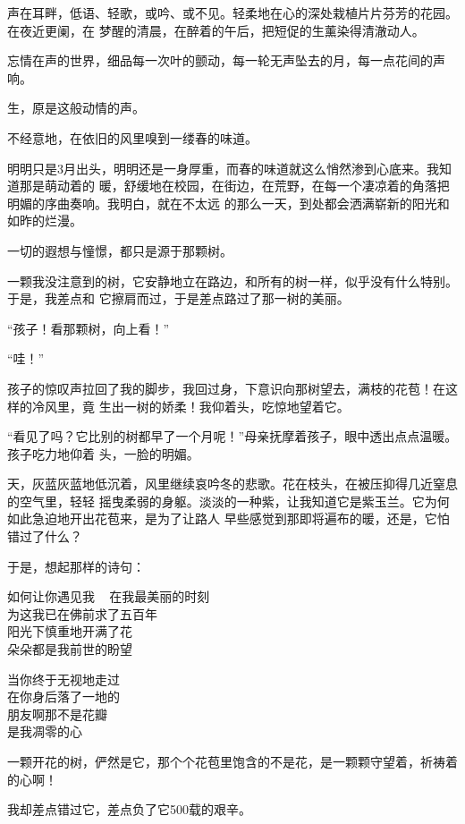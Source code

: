 		声在耳畔，低语、轻歌，或吟、或不见。轻柔地在心的深处栽植片片芬芳的花园。在夜近更阑，在
	梦醒的清晨，在醉着的午后，把短促的生薰染得清澈动人。

		忘情在声的世界，细品每一次叶的颤动，每一轮无声坠去的月，每一点花间的声响。

		生，原是这般动情的声。

	\endwriting



		不经意地，在依旧的风里嗅到一缕春的味道。

		明明只是3月出头，明明还是一身厚重，而春的味道就这么悄然渗到心底来。我知道那是萌动着的
	暖，舒缓地在校园，在街边，在荒野，在每一个凄凉着的角落把明媚的序曲奏响。我明白，就在不太远
	的那么一天，到处都会洒满崭新的阳光和如昨的烂漫。

		一切的遐想与憧憬，都只是源于那颗树。

		一颗我没注意到的树，它安静地立在路边，和所有的树一样，似乎没有什么特别。于是，我差点和
	它擦肩而过，于是差点路过了那一树的美丽。

		“孩子！看那颗树，向上看！”

		“哇！”

		孩子的惊叹声拉回了我的脚步，我回过身，下意识向那树望去，满枝的花苞！在这样的冷风里，竟
	生出一树的娇柔！我仰着头，吃惊地望着它。

		“看见了吗？它比别的树都早了一个月呢！”母亲抚摩着孩子，眼中透出点点温暖。孩子吃力地仰着
	头，一脸的明媚。

		天，灰蓝灰蓝地低沉着，风里继续哀吟冬的悲歌。花在枝头，在被压抑得几近窒息的空气里，轻轻
	摇曳柔弱的身躯。淡淡的一种紫，让我知道它是紫玉兰。它为何如此急迫地开出花苞来，是为了让路人
	早些感觉到那即将遍布的暖，还是，它怕错过了什么？

		于是，想起那样的诗句：

		\longpoem{}{}{}
			如何让你遇见我 ~ 在我最美丽的时刻 \\
			为这我已在佛前求了五百年 \\
			阳光下慎重地开满了花 \\
			朵朵都是我前世的盼望

			当你终于无视地走过 \\
			在你身后落了一地的 \\
			朋友啊那不是花瓣 \\
			是我凋零的心
		\endlongpoem

		一颗开花的树，俨然是它，那个个花苞里饱含的不是花，是一颗颗守望着，祈祷着的心啊！

		我却差点错过它，差点负了它500载的艰辛。

